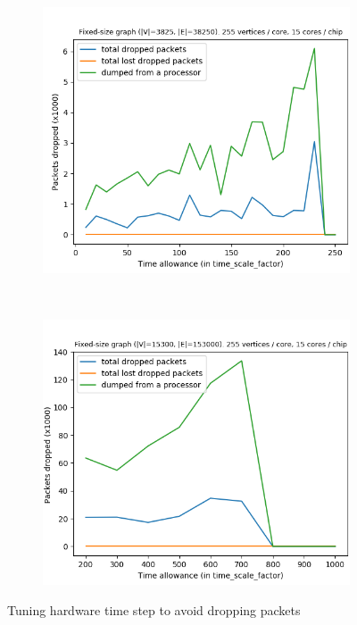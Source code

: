 \begin{figure}[!ht]
    \centering
    \begin{subfigure}[b]{0.5\textwidth}
        \includegraphics[width=\textwidth]{figures/packet_drop_vs_time_scale_factor-1.png}
        \caption{} \label{fig:graph11}
    \end{subfigure}%
    ~
    \begin{subfigure}[b]{0.5\textwidth}
        \includegraphics[width=\textwidth]{figures/packet_drop_vs_time_scale_factor-2.png}
        \caption{} \label{fig:graph12}
    \end{subfigure}
    \caption{Tuning hardware time step to avoid dropping packets}
    \label{fig:graph1}
\end{figure} 

